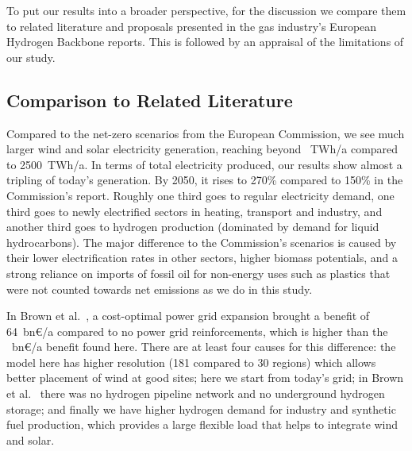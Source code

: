 To put our results into a broader perspective, for the discussion we compare
them to related literature and proposals presented in the gas industry's
European Hydrogen Backbone reports. This is followed by an appraisal of the
limitations of our study.

\subsection*{Comparison to Related Literature}

Compared to the net-zero scenarios from the European
Commission\cite{in-depth_2018}, we see much larger wind and solar electricity
generation, reaching beyond \maxvres~TWh/a compared to
2500~TWh/a.\cite{in-depth_2018} In terms of total electricity produced, our
results show almost a tripling of today's generation. By 2050, it rises to 270\%
compared to 150\% in the Commission's report.\cite{in-depth_2018} Roughly one
third goes to regular electricity demand, one third goes to newly electrified
sectors in heating, transport and industry, and another third goes to hydrogen
production (dominated by demand for liquid hydrocarbons). The major difference
to the Commission's scenarios\cite{in-depth_2018} is caused by their lower
electrification rates in other sectors, higher biomass potentials, and a strong
reliance on imports of fossil oil for non-energy uses such as plastics that were
not counted towards net emissions as we do in this study.

In Brown et al.~\cite{brownSynergiesSector2018}, a cost-optimal power grid expansion
brought a benefit of 64~bn\euro/a compared to no
power grid reinforcements, which is higher than the
\maxacbenefitabs~bn\euro/a benefit found here. There are at least four causes for
this difference: the model here has higher resolution (181 compared to 30
regions) which allows better placement of wind at good sites; here we start from
today's grid; in Brown et al.~\cite{brownSynergiesSector2018} there was no
hydrogen pipeline network and no underground hydrogen storage; and finally we
have higher hydrogen demand for industry and synthetic fuel production, which
provides a large flexible load that helps to integrate wind and solar.

